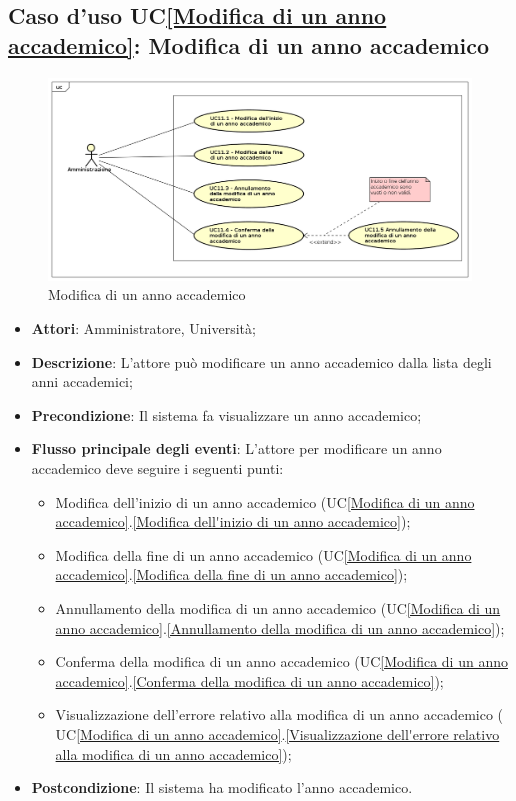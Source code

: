 \subsection{Caso d'uso UC\ref{Modifica di un anno accademico}: Modifica di un anno accademico}
\begin{figure} [H]
	\centering
	\includegraphics[scale=0.45]{./img/UseCaseDiagram011.png}
	\caption{Modifica di un anno accademico}\label{}
\end{figure}
\begin{itemize}
	\item \textbf{Attori}: Amministratore, Università;
	\item \textbf{Descrizione}: L'attore può modificare un anno accademico dalla lista degli anni accademici;
	\item \textbf{Precondizione}: Il sistema fa visualizzare un anno accademico;
	\item \textbf{Flusso principale degli eventi}: L'attore per modificare un anno accademico deve seguire i seguenti punti:
	\begin{itemize}
		\item Modifica dell'inizio di un anno accademico (UC\ref{Modifica di un anno accademico}.\ref{Modifica dell'inizio di un anno accademico});
		\item Modifica della fine di un anno accademico (UC\ref{Modifica di un anno accademico}.\ref{Modifica della fine di un anno accademico});
		\item Annullamento della modifica di un anno accademico (UC\ref{Modifica di un anno accademico}.\ref{Annullamento della modifica di un anno accademico});
		\item Conferma della modifica di un anno accademico (UC\ref{Modifica di un anno accademico}.\ref{Conferma della modifica di un anno accademico});
		\item Visualizzazione dell'errore relativo alla modifica di un anno accademico ( UC\ref{Modifica di un anno accademico}.\ref{Visualizzazione dell'errore relativo alla modifica di un anno accademico});
	\end{itemize}
	\item \textbf{Postcondizione}: Il sistema ha modificato l'anno accademico.
\end{itemize}

